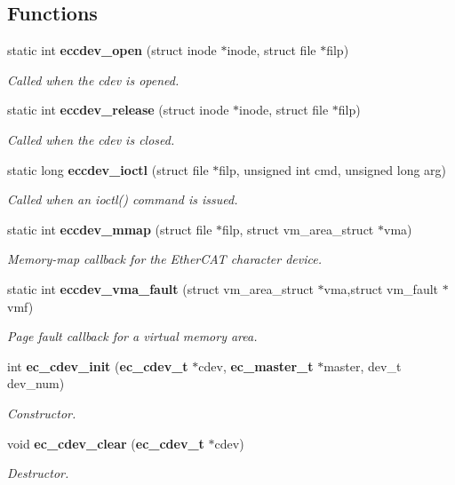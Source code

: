 \subsection*{Functions}
\begin{DoxyCompactItemize}
\item 
static int {\bf eccdev\-\_\-open} (struct inode $\ast$inode, struct file $\ast$filp)\label{cdev_8c_ac12a62dff23c807f50608bb1c3b99a69}

\begin{DoxyCompactList}\small\item\em Called when the cdev is opened. \end{DoxyCompactList}\item 
static int {\bf eccdev\-\_\-release} (struct inode $\ast$inode, struct file $\ast$filp)\label{cdev_8c_a0676fd59dff0432b9f378923d290129e}

\begin{DoxyCompactList}\small\item\em Called when the cdev is closed. \end{DoxyCompactList}\item 
static long {\bf eccdev\-\_\-ioctl} (struct file $\ast$filp, unsigned int cmd, unsigned long arg)\label{cdev_8c_abbf50f74e0ed9ba2d8db5b1f9184a49b}

\begin{DoxyCompactList}\small\item\em Called when an ioctl() command is issued. \end{DoxyCompactList}\item 
static int {\bf eccdev\-\_\-mmap} (struct file $\ast$filp, struct vm\-\_\-area\-\_\-struct $\ast$vma)
\begin{DoxyCompactList}\small\item\em Memory-\/map callback for the Ether\-C\-A\-T character device. \end{DoxyCompactList}\item 
static int {\bf eccdev\-\_\-vma\-\_\-fault} (struct vm\-\_\-area\-\_\-struct $\ast$vma,struct vm\-\_\-fault $\ast$vmf)
\begin{DoxyCompactList}\small\item\em Page fault callback for a virtual memory area. \end{DoxyCompactList}\item 
int {\bf ec\-\_\-cdev\-\_\-init} ({\bf ec\-\_\-cdev\-\_\-t} $\ast$cdev, {\bf ec\-\_\-master\-\_\-t} $\ast$master, dev\-\_\-t dev\-\_\-num)
\begin{DoxyCompactList}\small\item\em Constructor. \end{DoxyCompactList}\item 
void {\bf ec\-\_\-cdev\-\_\-clear} ({\bf ec\-\_\-cdev\-\_\-t} $\ast$cdev)
\begin{DoxyCompactList}\small\item\em Destructor. \end{DoxyCompactList}\end{DoxyCompactItemize}
